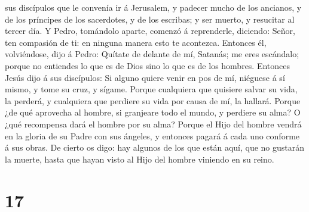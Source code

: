 sus discípulos que le convenía ir á Jerusalem, y padecer mucho de los
ancianos, y de los príncipes de los sacerdotes, y de los escribas; y ser
muerto, y resucitar al tercer día.  Y Pedro, tomándolo
aparte, comenzó á reprenderle, diciendo: Señor, ten compasión de ti: en
ninguna manera esto te acontezca.  Entonces él,
volviéndose, dijo á Pedro: Quítate de delante de mí, Satanás; me eres
escándalo; porque no entiendes lo que es de Dios sino lo que es de los
hombres.  Entonces Jesús dijo á sus discípulos: Si alguno
quiere venir en pos de mí, niéguese á sí mismo, y tome su cruz, y
sígame.  Porque cualquiera que quisiere salvar su vida,
la perderá, y cualquiera que perdiere su vida por causa de mí, la
hallará.  Porque ¿de qué aprovecha al hombre, si
granjeare todo el mundo, y perdiere su alma? O ¿qué recompensa dará el
hombre por su alma?  Porque el Hijo del hombre vendrá en
la gloria de su Padre con sus ángeles, y entonces pagará á cada uno
conforme á sus obras.  De cierto os digo: hay algunos de
los que están aquí, que no gustarán la muerte, hasta que hayan visto al
Hijo del hombre viniendo en su reino.

\hypertarget{section-16}{%
\section{17}\label{section-16}}

